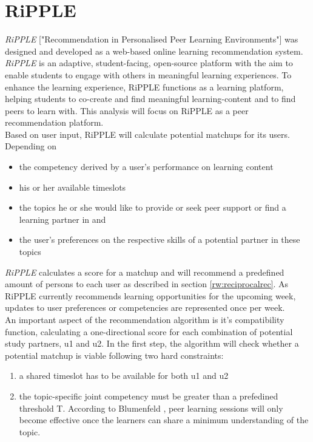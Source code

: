 \documentclass[nochapterpage,bigchapter,linedtoc,longdoc,colorback,accentcolor=tud3b,oneside]{tudreport}
\begin{document}
\section{RiPPLE} \label{paper:Ripple}
\textit{RiPPLE} ["Recommendation in Personalised Peer Learning Environments"] was designed and developed as a web-based online learning recommendation system. \textit{RiPPLE} is an adaptive, student-facing, open-source platform with the aim to enable students to engage with others in meaningful learning experiences. To enhance the learning experience, RiPPLE functions as a learning platform, helping students to co-create and find meaningful learning-content and to find peers to learn with. This analysis will focus on RiPPLE as a peer recommendation platform.\\
Based on user input, RiPPLE will calculate potential matchups for its users. Depending on
\begin{itemize}
	\item the competency derived by a user's performance on learning content
	\item his or her available timeslots
	\item the topics he or she would like to provide or seek peer support or find a learning partner in and
	\item the user's preferences on the respective skills of a potential partner in these topics
\end{itemize}
\textit{RiPPLE} calculates a score for a matchup and will recommend a predefined amount of persons to each user as described in section \ref{rw:reciprocalrec}. As RiPPLE currently recommends learning opportunities for the upcoming week, updates to user preferences or competencies are represented once per week.\\
An important aspect of the recommendation algorithm is it's compatibility function, calculating a one-directional score for each combination of potential study partners, u1 and u2. In the first step, the algorithm will check whether a potential matchup is viable following two hard constraints:
\begin{enumerate}
	\item a shared timeslot has to be available for both u1 and u2
	\item the topic-specific joint competency must be greater than a prefedined threshold T. According to Blumenfeld \cite{blumenfeld1996learning}, peer learning sessions will only become effective once the learners can share a minimum understanding of the topic.
\end{enumerate}
\end{document}
